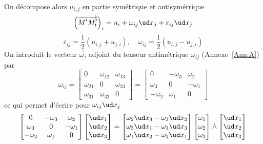 On décompose alors $u_{i,j}$ en partie symétrique et antisymétrique
\begin{equation*}
    \left( \overrightarrow{M'M_t'} \right)_i = u_i + \omega_{ij} \ud x_j + \varepsilon_{ij} \ud x_j
\end{equation*}
\begin{equation}
    \varepsilon_{ij} = \frac{1}{2} \left( u_{i,j} + u_{j,i} \right), \quad \omega_{ij} = \frac{1}{2} \left( u_{i,j} - u_{j,i} \right)
    \label{eq:Ch03-034}
\end{equation}
On introduit le vecteur $\vec{\omega}$, adjoint du tenseur antimétrique $\omega_{ij}$ (Annexe~\ref{Ann:A}) par
\begin{equation}
    \omega_{ij} =
    \begin{bmatrix}
        0 & \omega_{12} & \omega_{13} \\
        \omega_{21} & 0 & \omega_{23} \\
        \omega_{31} & \omega_{32} & 0
    \end{bmatrix}
    =
    \begin{bmatrix}
        0 & -\omega_{3} & \omega_{2} \\
        \omega_{3} & 0 & -\omega_{1} \\
        -\omega_{2} & \omega_{1} & 0
    \end{bmatrix}
    \label{eq:Ch03-035}
\end{equation}
ce qui permet d'écrire pour $\omega_{ij} \ud x_j$
\begin{equation}
    \begin{bmatrix}
        0 & -\omega_{3} & \omega_{2} \\
        \omega_{3} & 0 & -\omega_{1} \\
        -\omega_{2} & \omega_{1} & 0
    \end{bmatrix}
    \begin{bmatrix}
        \ud x_1 \\
        \ud x_2 \\
        \ud x_3
    \end{bmatrix}
    =
    \begin{bmatrix}
        \omega_2 \ud x_3 - \omega_3 \ud x_2 \\
        \omega_3 \ud x_1 - \omega_1 \ud x_3 \\
        \omega_1 \ud x_2 - \omega_2 \ud x_1
    \end{bmatrix}
    \begin{bmatrix}
        \omega_1 \\
        \omega_2 \\
        \omega _3
    \end{bmatrix}
    \wedge 
    \begin{bmatrix}
        \ud x_1 \\
        \ud x_2 \\
        \ud x_3
    \end{bmatrix}
    \label{eq:Ch03-036}
\end{equation}
